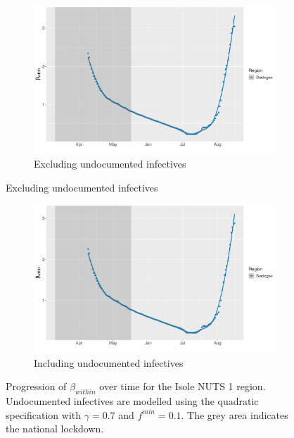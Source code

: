 \documentclass[12pt]{article}
\begin{document}
\begin{appendices}
		\begin{figure}[H]
    	    \centering
    	    \begin{subfigure}{\textwidth}
    	      \centering
    	      \includegraphics[width=0.94\linewidth]{output/model_within_lag14_betawithin_Isole_rollingwindow30.pdf}
    	      \caption{Excluding undocumented infectives}
    	      \label{fig:beta_within_over_time_isole_lowsample_regular}
    	    \end{subfigure}\newline
        \end{figure}
        \begin{figure}[H]\ContinuedFloat
    	    \begin{subfigure}{\textwidth}
    	      \centering
    	      \includegraphics[width=0.94\linewidth]{output/model_within_lag14_betawithin_Isole_UndocQuadratic_rollingwindow30.pdf}
    	      \caption{Including undocumented infectives}
    	      \label{fig:beta_within_over_time_isole_lowsample_regular_undoc}
    	    \end{subfigure}
    	    \caption{Progression of $\beta_{within}$ over time for the Isole NUTS 1 region. Undocumented infectives are modelled using the quadratic specification with $\gamma = 0.7$ and $f^{min}=0.1$. The grey area indicates the national lockdown.}
    	    \label{fig:beta_within_over_time_isole_lowsample}
	    \end{figure}
		

\end{appendices}
\end{document}
